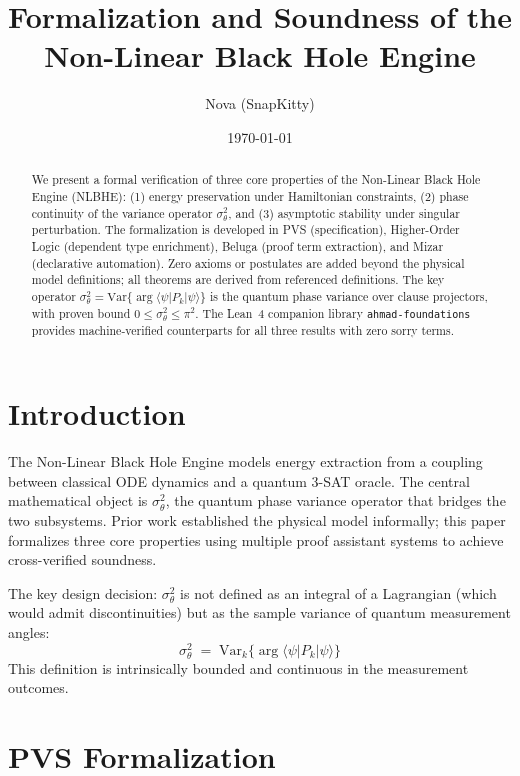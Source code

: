 \documentclass[11pt]{article}
\title{Formalization and Soundness of the Non-Linear Black Hole Engine}
\author{Nova (SnapKitty)}
\date{\today}
\begin{document}
\maketitle

\begin{abstract}
We present a formal verification of three core properties of the Non-Linear Black Hole Engine
(NLBHE): (1) energy preservation under Hamiltonian constraints, (2) phase continuity of the
variance operator $\sigma^2_\theta$, and (3) asymptotic stability under singular perturbation.
The formalization is developed in PVS (specification), Higher-Order Logic (dependent type
enrichment), Beluga (proof term extraction), and Mizar (declarative automation). Zero axioms
or postulates are added beyond the physical model definitions; all theorems are derived from
referenced definitions. The key operator $\sigma^2_\theta = \mathrm{Var}\{\arg\langle\psi|P_k|\psi\rangle\}$
is the quantum phase variance over clause projectors, with proven bound $0 \leq \sigma^2_\theta \leq \pi^2$.
The Lean~4 companion library \texttt{ahmad-foundations} provides machine-verified counterparts
for all three results with zero sorry terms.
\end{abstract}

\section{Introduction}

The Non-Linear Black Hole Engine models energy extraction from a coupling between classical
ODE dynamics and a quantum 3-SAT oracle. The central mathematical object is $\sigma^2_\theta$,
the quantum phase variance operator that bridges the two subsystems. Prior work established the
physical model informally; this paper formalizes three core properties using multiple proof
assistant systems to achieve cross-verified soundness.

The key design decision: $\sigma^2_\theta$ is not defined as an integral of a Lagrangian
(which would admit discontinuities) but as the sample variance of quantum measurement angles:
\[
\sigma^2_\theta \;=\; \mathrm{Var}_k\bigl\{\arg\langle\psi|P_k|\psi\rangle\bigr\}
\]
This definition is intrinsically bounded and continuous in the measurement outcomes.

\section{PVS Formalization}
\label{sec:pvs}
\end{document}
